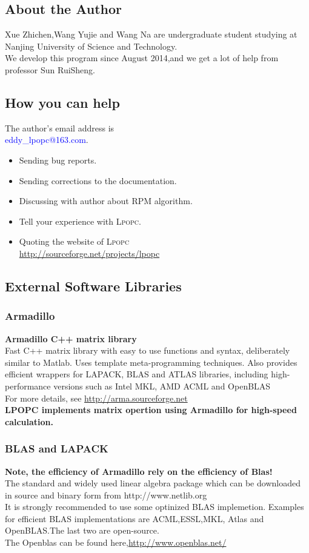 \documentclass[10pt]{article}
\newcommand{\LPOPC}{\textsc{Lpopc}\xspace}
\begin{document}
    \subsection{About the Author}
    Xue Zhichen,Wang Yujie and Wang Na are undergraduate student studying at Nanjing University of Science and Technology.\\
    We develop this program since August 2014,and we get a lot of help from professor Sun RuiSheng. \\
    \subsection{How you can help}
    The author's email address is \\
    \textcolor{blue}{eddy\_lpopc@163.com}.
    \begin{itemize}
    	\item Sending bug reports.
    	\item Sending corrections to the documentation.
    	\item Discussing with author about RPM algorithm.
    	\item Tell your experience with \LPOPC.
    	\item Quoting the website of \LPOPC\\
    	\url{http://sourceforge.net/projects/lpopc}
    \end{itemize}
    \subsection{External Software Libraries}
	    \subsubsection{Armadillo}
	     \textbf{Armadillo C++ matrix library}\\
	     Fast C++ matrix library with easy to use functions and syntax, deliberately similar to Matlab. Uses template meta-programming techniques.
	     Also provides efficient wrappers for LAPACK, BLAS and ATLAS libraries, including high-performance versions such as Intel MKL, AMD ACML and OpenBLAS\cite{sanderson2010armadillo}\\
	     For more details, see \url{http://arma.sourceforge.net}\\
	     \textbf{LPOPC implements matrix opertion using Armadillo for high-speed calculation.}
	     \subsubsection{BLAS and LAPACK}
	     \textbf{Note, the efficiency of Armadillo rely on the efficiency of Blas!}\\
	     The standard and widely used linear algebra package which can be downloaded in source and binary form from http://www.netlib.org\\
	     It is strongly recommended to use some optinized  BLAS implemetion.
	     Examples for efficient BLAS implementations are ACML,ESSL,MKL,
	     Atlas and OpenBLAS.The last two are open-source.\\
	     The Openblas can be found here,\url{http://www.openblas.net/}\\
	     
\end{document}
